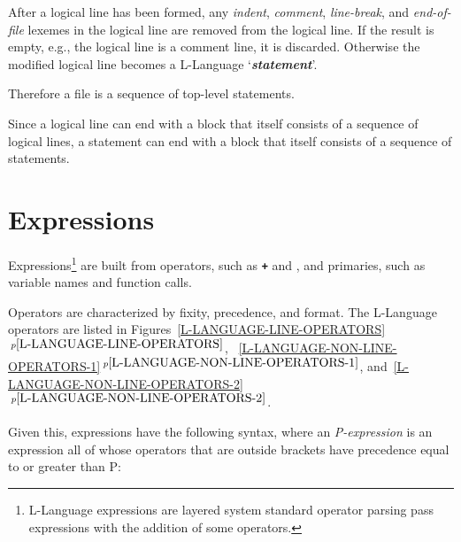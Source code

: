 \documentclass[12pt]{article}
\newcommand{\TT}[1]{{\tt \bfseries #1}}
\newcommand{\emkey}[1]{{\em \bfseries #1}}
\newcommand{\itemref}[1]{\ref{#1}$\,^{p\pageref{#1}}$}
\begin{document}
After a logical line
has been formed, any {\em indent},
{\em comment}, {\em line-break}, and {\em end-of-file}
lexemes in the logical line
are removed from the logical line.  If the result is
empty, e.g., the logical line is a comment line, it is discarded.
Otherwise the
modified logical line becomes a L-Language
`\emkey{statement}'\label{STATEMENT}.

Therefore a file is a sequence of top-level statements.

Since a logical line can end with a block that itself consists
of a sequence of logical lines, a statement can end with
a block that itself consists of a sequence of statements.

\newpage

\section{Expressions}

Expressions\footnote{
L-Language expressions are
layered system standard operator parsing pass
expressions with the addition of some
operators.}
are built from operators, such as \TT{+} and \TT{*},
and primaries, such as variable names and function calls.

Operators are characterized by fixity, precedence, and format.
The L-Language operators are listed in
Figures~\itemref{L-LANGUAGE-LINE-OPERATORS},
~\itemref{L-LANGUAGE-NON-LINE-OPERATORS-1},
and~\itemref{L-LANGUAGE-NON-LINE-OPERATORS-2}.


Given this, expressions have the following syntax,
where an {\em P-expression}
is an expression all of whose operators that are outside brackets
have precedence equal to or greater than P:
\end{document}
